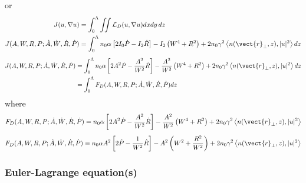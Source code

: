 or
\begin{equation}
    \begin{split}
        J(u,\nabla u) &= \int_{0}^{\Lambda} \iint \mathcal{L}_{D}(u,\nabla u) dx dy \, dz\\   
        J(A,W,R,P;\dot{A},\dot{W},\dot{R},\dot{P}) &= \int_{0}^{\Lambda} n_0 \alpha \left[2 I_0 \dot{P}  - I_2 \dot{R} \right] - I_2 \left(W^4 + R^2\right) +  2n_0 \gamma^2 \left< n(\vect{r}_{\perp},z),|u|^2  \right>   dz\\
    \end{split}
\end{equation}
\begin{equation}
    \begin{split}
        J(A,W,R,P;\dot{A},\dot{W},\dot{R},\dot{P}) &= \int_{0}^{\Lambda} n_0 \alpha \left[2A^2 \dot{P} - \frac{A^2 }{W^2}\dot{R} \right]  - \frac{A^2}{W^2} \left(W^4 + R^2\right) +  2n_0 \gamma^2 \left< n(\vect{r}_{\perp},z),|u|^2  \right>  dz\\
    &=\int_{0}^{\Lambda} F_{D}(A,W,R,P;\dot{A},\dot{W},\dot{R},\dot{P})  dz\\
    \end{split}
\end{equation}
where
\begin{equation}
    F_{D}(A,W,R,P;\dot{A},\dot{W},\dot{R},\dot{P}) = n_0 \alpha \left[2A^2 \dot{P} - \frac{A^2 }{W^2}\dot{R} \right]  - \frac{A^2}{W^2} \left(W^4 + R^2\right) +  2n_0 \gamma^2 \left< n(\vect{r}_{\perp},z),|u|^2  \right> 
\end{equation}
 \begin{equation}
    F_{D}(A,W,R,P;\dot{A},\dot{W},\dot{R},\dot{P}) = n_0 \alpha A^2 \left[2 \dot{P} - \frac{1}{W^2}\dot{R} \right]  - A^2 \left(W^2 + \frac{R^2}{W^2}\right) +  2n_0 \gamma^2 \left< n(\vect{r}_{\perp},z),|u|^2  \right> 
\end{equation}

\subsubsection{Euler-Lagrange equation(s)}


